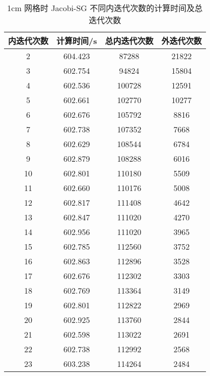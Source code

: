 \begin{datasheet}
\begin{table}
\centering
\caption{1cm 网格时 Jacobi-SG 不同内迭代次数的计算时间及总迭代次数}
\label{tab:equsolve.iter.jacobi-sg.1cm}
\begin{tabular}{cccc}
\toprule
内迭代次数 & 计算时间/s & 总内迭代次数 & 外迭代次数\\
\midrule
2 & 604.423 & 87288 & 21822 \\ %
3 & 602.754 & 94824 & 15804 \\ %
4 & 602.536 & 100728 & 12591 \\ %
5 & 602.661 & 102770 & 10277 \\ %
6 & 602.676 & 105792 & 8816 \\ %
7 & 602.738 & 107352 & 7668 \\ %
8 & 602.629 & 108544 & 6784 \\ %
9 & 602.879 & 108288 & 6016 \\ %
10 & 602.801 & 110180 & 5509 \\ %
11 & 602.660 & 110176 & 5008 \\ %
12 & 602.817 & 111408 & 4642 \\ %
13 & 602.847 & 111020 & 4270 \\ %
14 & 602.956 & 111020 & 3965 \\ %
15 & 602.785 & 112560 & 3752 \\ %
16 & 602.863 & 112896 & 3528 \\ %
17 & 602.676 & 112302 & 3303 \\ %
18 & 602.769 & 113364 & 3149 \\ %
19 & 602.801 & 112822 & 2969 \\ %
20 & 602.925 & 113760 & 2844 \\ %
21 & 602.598 & 113022 & 2691 \\ %
22 & 602.738 & 112992 & 2568 \\ %
23 & 603.238 & 114264 & 2484 \\ %

\end{tabular}
\end{table}
\end{datasheet}
